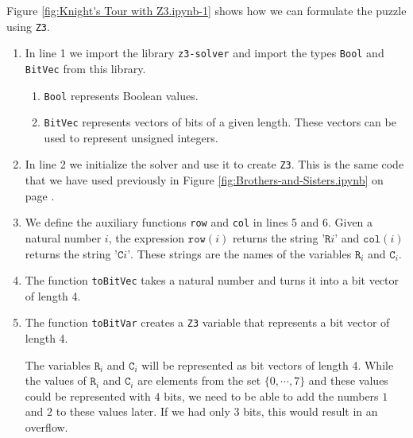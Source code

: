 Figure \ref{fig:Knight's Tour with Z3.ipynb-1} shows how we can formulate the puzzle using \texttt{Z3}.
\begin{enumerate}
\item In line 1 we import the library \texttt{z3-solver} and import the types \texttt{Bool} and
      \texttt{BitVec} from this library. 
      \begin{enumerate}
      \item \texttt{Bool} represents Boolean values.
      \item \texttt{BitVec} represents vectors of bits of a given length.  These vectors can be used to
            represent unsigned integers.
      \end{enumerate}
  
\item In line 2 we initialize the solver and use it to create \texttt{Z3}.
      This is the same code that we have used previously in Figure \ref{fig:Brothers-and-Sisters.ipynb} on page
      \pageref{fig:Brothers-and-Sisters.ipynb}.  
\item We define the auxiliary functions \texttt{row} and \texttt{col} in lines 5 and 6.
      Given a natural number $i$, the expression $\mathtt{row}(i)$ returns the string $\texttt{'R}i\texttt{'}$
      and  $\mathtt{col}(i)$ returns the string  $\texttt{'C}i\texttt{'}$.  These strings are the names of the
      variables $\mathtt{R}_i$ and $\mathtt{C}_i$.
\item The function \texttt{toBitVec} takes a natural number and turns it into a bit vector of length 4.
\item The function \texttt{toBitVar} creates a \texttt{Z3} variable that represents a bit vector of length 4.

      The variables $\mathtt{R}_i$ and $\mathtt{C}_i$ will be represented as bit vectors of length 4.
      While the values of $\mathtt{R}_i$ and $\mathtt{C}_i$  are elements from the set $\{0, \cdots, 7\}$ and
      these values could be represented with $4$ bits, we need to be able to add the numbers $1$ and $2$ to
      these values later.  If we had only $3$ bits, this would result in an overflow. 
      

\end{enumerate}
